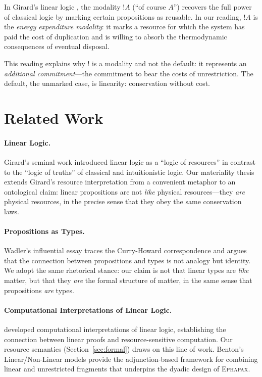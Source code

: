 \documentclass[11pt,a4paper]{article}
\newcommand{\ephapax}{\textsc{Ephapax}}
\newcommand{\bang}{!}
\begin{document}
In Girard's linear logic \citep{girard1987linear}, the modality
$\bang A$ (``of course $A$'') recovers the full power of classical
logic by marking certain propositions as reusable. In our reading,
$\bang A$ is the \emph{energy expenditure modality}: it marks a
resource for which the system has paid the cost of duplication and is
willing to absorb the thermodynamic consequences of eventual
disposal.

This reading explains why $\bang$ is a modality and not the default:
it represents an \emph{additional commitment}---the commitment to
bear the costs of unrestriction. The default, the unmarked case, is
linearity: conservation without cost.


\section{Related Work}
\label{sec:related}

\paragraph{Linear Logic.}
Girard's seminal work \citep{girard1987linear} introduced linear
logic as a ``logic of resources'' in contrast to the ``logic of
truths'' of classical and intuitionistic logic. Our materiality
thesis extends Girard's resource interpretation from a convenient
metaphor to an ontological claim: linear propositions are not
\emph{like} physical resources---they \emph{are} physical resources,
in the precise sense that they obey the same conservation laws.

\paragraph{Propositions as Types.}
Wadler's influential essay \citep{wadler2015propositions} traces the
Curry-Howard correspondence and argues that the connection between
propositions and types is not analogy but identity. We adopt the same
rhetorical stance: our claim is not that linear types are \emph{like}
matter, but that they \emph{are} the formal structure of matter, in
the same sense that propositions \emph{are} types.

\paragraph{Computational Interpretations of Linear Logic.}
\citet{abramsky1993computational} developed computational
interpretations of linear logic, establishing the connection between
linear proofs and resource-sensitive computation. Our resource
semantics (Section~\ref{sec:formal}) draws on this line of work.
Benton's Linear/Non-Linear models \citep{benton1994mixed}
provide the adjunction-based framework for combining linear and
unrestricted fragments that underpins the dyadic design of \ephapax{}.
\end{document}
